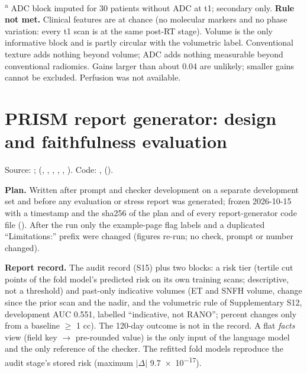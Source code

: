 \documentclass[11pt,a4paper]{article}
\begin{document}
\textsuperscript{a} ADC block imputed for 30 patients without ADC at t1; secondary only. \textbf{Rule not
met.} Clinical features are at chance (no molecular markers and no phase variation: every t1 scan is at the
same post-RT stage). Volume is the only informative block and is partly circular with the volumetric label.
Conventional texture adds nothing beyond volume; ADC adds nothing measurable beyond conventional radiomics.
Gains larger than about 0.04 are unlikely; smaller gains cannot be excluded. Perfusion was not available.

\FloatBarrier
\section{PRISM report generator: design and faithfulness evaluation}\label{sec:S19}

Source: ;
(, , , ,
, ). Code: ,
 ().

\textbf{Plan.} Written after prompt and checker development on a separate development set and before any
evaluation or stress report was generated; frozen 2026-10-15 with a timestamp and the sha256 of the plan and of
every report-generator code file (). After the run only the
example-page flag labels and a duplicated ``Limitations:'' prefix were changed (figures re-run; no check, prompt
or number changed).

\textbf{Report record.} The audit record (S15) plus two blocks: a risk tier (tertile cut points of the fold
model's predicted risk on its own training scans; descriptive, not a threshold) and past-only indicative volumes
(ET and SNFH volume, change since the prior scan and the nadir, and the volumetric rule of Supplementary S12,
development AUC 0.551, labelled ``indicative, not RANO''; percent changes only from a baseline $\geq$ 1 cc). The
120-day outcome is not in the record. A flat \emph{facts} view (field key $\rightarrow$ pre-rounded value) is the only
input of the language model and the only reference of the checker. The refitted fold models reproduce the audit
stage's stored risk (maximum $|\Delta|$ \num{9.7e-17}).
\end{document}
